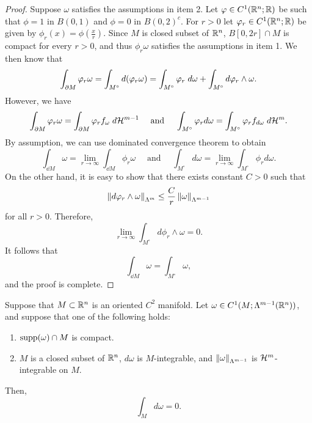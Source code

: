 \documentclass[a4paper]{article}
\begin{document}
\begin{proof}
Suppose $\omega$ satisfies the assumptions in item 2.
Let $\varphi \in C^1 (\mathbb{R}^n ; \mathbb{R})$ be such that $\phi = 1$
in $B(0,1)$ and $\phi = 0$ in $B(0, 2)^c$. For $r > 0$
let $\varphi_r \in C^1 (\mathbb{R}^n ; \mathbb{R})$ be given by
$\phi_r (x) = \phi(\frac{x}{r})$. Since $M$ is closed subset
of $\mathbb{R}^n$, $B[0, 2r] \cap M$ is compact for every $r > 0$,
and thus $\phi_r \omega$ satisfies the assumptions in item 1.
We then know that
\[
\int_{\partial M} \varphi_r \omega
= \int_{M^\circ} d (\varphi_r \omega)
= \int_{M^\circ} \varphi_r \; d \omega + \int_{M^\circ} d \varphi_r
\wedge \omega.
\]
However, we have
\[
\int_{\partial M} \varphi_r \omega = \int_{\partial M} \varphi_r
f_\omega \; d \mathcal{H}^{m-1}
\quad \text{ and } \quad
\int_{M^\circ} \varphi_r d \omega
= \int_{M^\circ} \varphi_r f_{d \omega} \; d \mathcal{H}^m.
\]
By assumption, we can use dominated convergence theorem
to obtain
\[
\int_{\dd M} \omega = \lim_{r \to \infty}
\int_{\dd M} \phi_r \omega
\quad \text{ and } \quad
\int_{M^\circ} d \omega
= \lim_{r \to \infty} \int_{M^\circ} \phi_r d \omega.
\]
On the other hand, it is easy to show that there exists
constant $C > 0$ such that
\[
\left\lVert d \varphi_r \wedge \omega\right\rVert_{\Lambda^m}
\leq \frac{C}{r} \left\lVert \omega\right\rVert_{\Lambda^{m-1}}
\]
for all $r > 0$. Therefore,
\[
\lim_{r \to \infty} \int_{M^\circ} d \phi_r \wedge \omega
= 0.
\]
It follows that
\[
\int_{\dd M} \omega = \int_{M^\circ} \omega,
\]
and the proof is complete.
\end{proof}

\begin{thm}
Suppose that $M \subset \mathbb{R}^n$ is an oriented $C^2$ manifold.
Let $\omega
\in C^1 (M; \Lambda^{m-1} (\mathbb{R}^n))$, and suppose that one of
the following holds:
\begin{enumerate}
  \item $\operatorname{supp} (\omega) \cap M$ is compact.
  \item $M$ is a closed subset of $\mathbb{R}^n$,
  $d \omega$ is $M$-integrable,
  and $\left\lVert \omega\right\rVert_{\Lambda^{m-1}}$ is $\mathcal{H}^m$-integrable
  on $M$.
\end{enumerate}
Then,
\[
\int_M d \omega = 0.
\]
\end{thm}
\end{document}
